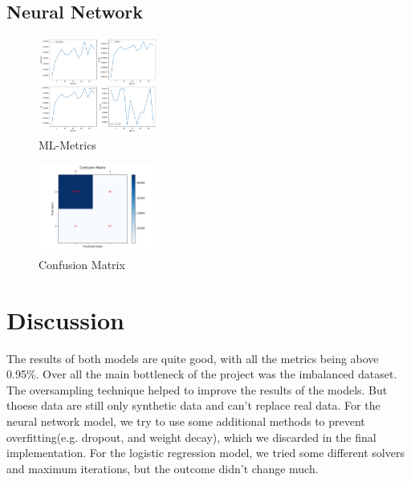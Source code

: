 \documentclass[a4, 10 pt, conference]{ieeeconf}  %
\begin{document}
\subsection{Neural Network}
\begin{figure}[!htb]
  \centering
  \includegraphics[width=0.35\textwidth]{images/ml.png}
  \caption{ML-Metrics}
  \label{fig:ml}
\end{figure}
\begin{figure}[!htb]
  \centering
  \includegraphics[width=0.35\textwidth]{images/ml_confusion.png}
  \caption{Confusion Matrix}
  \label{fig:ml-confusion}
\end{figure}


\section{Discussion}
\label{sec:discuss}



The results of both models are quite good, with all the metrics being above 0.95\%. Over all the main bottleneck of the project was the imbalanced dataset. The oversampling technique helped to improve the results of the models. But thoese data are still only synthetic data and can't replace real data.
For the neural network model, we try to use some additional methods to prevent overfitting(e.g. dropout, and weight decay), which we discarded in the final implementation. For the logistic regression model, we tried some different solvers and maximum iterations, but the outcome didn't change much.
\end{document}
